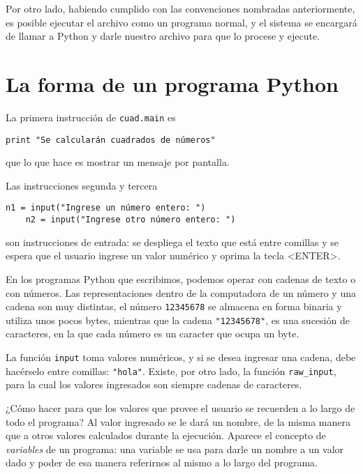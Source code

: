 \begin{observacion}
Por otro lado, habiendo cumplido con las convenciones nombradas
anteriormente, es posible ejecutar el archivo como un programa normal, y el
sistema se encargará de llamar a Python y darle nuestro archivo para que lo
procese y ejecute.
\end{observacion}

\section{La forma de un programa Python}

La primera instrucción de \verb+cuad.main+ es
\begin{lstlisting}[firstnumber=6]
    print "Se calcularán cuadrados de números"
\end{lstlisting}
que lo que hace es mostrar un mensaje por pantalla.

Las instrucciones segunda y tercera
\begin{lstlisting}[firstnumber=8]
    n1 = input("Ingrese un número entero: ")
    n2 = input("Ingrese otro número entero: ")
\end{lstlisting}
son instrucciones de entrada: se despliega el texto que está entre
comillas y se espera que el usuario ingrese un valor numérico y
oprima la tecla <ENTER>.

\begin{sabias_que}
En los programas Python que escribimos, podemos operar con cadenas de texto
o con números.  Las representaciones dentro de la computadora de un número y
una cadena son muy distintas, el número \lstinline!12345678! se almacena en
forma binaria y utiliza unos pocos bytes, mientras que la cadena
\lstinline!"12345678"!, es una sucesión de caracteres, en la que cada
número es un caracter que ocupa un byte.

La función \lstinline!input! toma valores numéricos, y si se desea
ingresar una cadena, debe hacérselo entre comillas: \lstinline!"hola"!.
Existe, por otro lado, la función \lstinline!raw_input!, para la cual los
valores ingresados son siempre cadenas de caracteres.
\end{sabias_que}

¿Cómo hacer para que los valores que provee el usuario se recuerden
a lo largo de todo el programa? Al valor ingresado se le dará un
nombre, de la misma manera que a otros valores calculados durante
la ejecución. Aparece el concepto de {\it variables} de un
programa: una variable se usa para darle un nombre a un valor dado
y poder de esa manera referirnos al mismo a lo largo del
programa.

